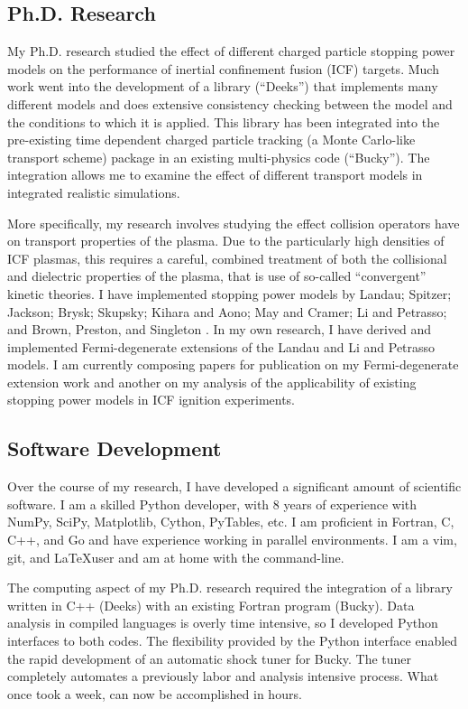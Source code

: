 \documentclass[letterpaper,11pt]{article}
\begin{document}
\subsection*{Ph.D. Research}
My Ph.D. research studied the effect of different charged particle stopping
power models on the performance of inertial confinement fusion (ICF) targets.
Much work went into the development of a library (``Deeks'') that implements
many different models and does extensive consistency checking between the model
and the conditions to which it is applied.  This library has been integrated
into the pre-existing time dependent charged particle tracking (a Monte
Carlo-like transport scheme) package in an existing multi-physics code
(``Bucky'').  The integration allows me to examine the effect of different
transport models in integrated realistic simulations.

\vspace{0.1in}

More specifically, my research involves studying the effect collision operators have on transport properties of the plasma.  Due to the particularly high densities of ICF plasmas, this requires a careful, combined treatment of both the collisional and dielectric properties of the plasma, that is use of so-called ``convergent'' kinetic theories.  I have implemented stopping power models by 
Landau; 
Spitzer; 
Jackson; 
Brysk; 
Skupsky; 
Kihara and Aono; 
May and Cramer; 
Li and Petrasso; 
and 
Brown, Preston, and Singleton%
.
In my own research, I have derived and implemented Fermi-degenerate extensions of the Landau and Li and Petrasso models.  I am currently composing papers for publication on my Fermi-degenerate extension work and another on my analysis of the applicability of existing stopping power models in ICF ignition experiments.  


\subsection*{Software Development}
Over the course of my research, I have developed a significant amount of
scientific software.  I am a skilled Python developer, with 8 years of
experience with NumPy, SciPy, Matplotlib, Cython, PyTables, etc.  I am
proficient in Fortran, C, C++, and Go and have experience working in parallel
environments.  I am a vim, git, and \LaTeX user and am at home with the
command-line.

The computing aspect of my Ph.D. research required the integration of a library
written in C++ (Deeks) with an existing Fortran program (Bucky).  Data analysis
in compiled languages is overly time intensive, so I developed Python
interfaces to both codes.  The flexibility provided by the Python interface
enabled the rapid development of an automatic shock tuner for Bucky.  The tuner
completely automates a previously labor and analysis intensive process.  What
once took a week, can now be accomplished in hours.
\end{document}
